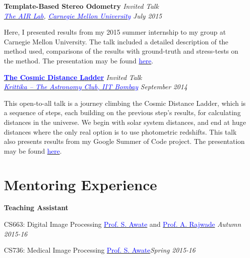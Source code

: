 \documentclass[margin,line]{res}
\newenvironment{list1}{
  \begin{list}{\ding{113}}{%
      \setlength{\itemsep}{0in}
      \setlength{\parsep}{0in} \setlength{\parskip}{0in}
      \setlength{\topsep}{0in} \setlength{\partopsep}{0in} 
      \setlength{\leftmargin}{0.17in}}}{\end{list}}
\begin{document}
\begin{resume}
{\bf Template-Based Stereo Odometry} \hfill {\em Invited Talk} \\
{\em \href{http://theairlab.org/}{\textcolor{blue}{The AIR Lab}}, \href{http://www.cmu.edu/}{\textcolor{blue}{Carnegie Mellon University}} \hfill July 2015} \\
\vspace*{-.15in}
\begin{list1}
\item[] Here, I presented results from my 2015 summer internship to my group at Carnegie Mellon University. The talk included a detailed description of the method used, comparisons of the results with ground-truth and stress-tests on the method. The presentation may be found \href{http://alankarkotwal.github.io/intern_presentation.pptx}{\textcolor{blue} {here}}.
\end{list1}

{\bf \href{http://www.stab-iitb.org/krittika/the-cosmic-ladder-distance}{\textcolor{blue} {The Cosmic Distance Ladder}}} \hfill {\em Invited Talk} \\
{\em \href{http://www.stab-iitb.org/krittika/}{\textcolor{blue} {Krittika -- The Astronomy Club, IIT Bombay}} \hfill September 2014} \\
\vspace*{-.15in}
\begin{list1}
\item[] This open-to-all talk is a journey climbing the Cosmic Distance Ladder, which is a sequence of steps, each building on the previous step's results, for calculating distances in the universe. We begin with solar system distances, and end at huge distances where the only real option is to use photometric redshifts. This talk also presents results from my Google Summer of Code project. The presentation may be found \href{http://alankarkotwal.github.io/CosmicDistanceLadder.pptx}{\textcolor{blue} {here}}.
\end{list1}


\section{\sc Mentoring Experience}
\textbf{Teaching Assistant}
\begin{list1}
\item[]CS663: Digital Image Processing \hspace{0.5cm} \href{https://www.cse.iitb.ac.in/~suyash}{\textcolor{blue}{Prof. S. Awate}} and \href{https://www.cse.iitb.ac.in/~ajitvr}{\textcolor{blue}{Prof. A. Rajwade}} \hfill{\textit{Autumn 2015-16}}
\item[]CS736: Medical Image Processing \hspace{2cm} \href{https://www.cse.iitb.ac.in/~suyash}{\textcolor{blue}{Prof. S. Awate}}\hfill{\textit{Spring 2015-16}}
\end{list1}


\end{resume}
\end{document}
